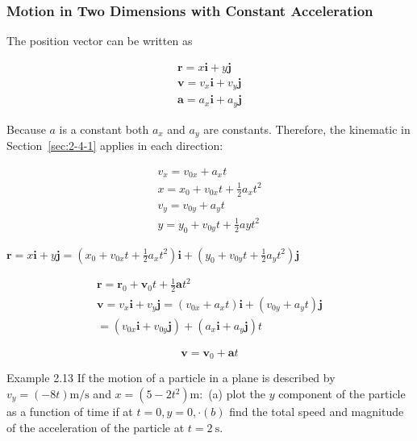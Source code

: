 \documentclass[10pt]{article}
\numberwithin{equation}{section}
\begin{document}
\subsubsection{Motion in Two Dimensions with Constant Acceleration}\label{sec:2-4-3}
The position vector can be written as

$$
\begin{gathered}
\mathbf{r}=x \mathbf{i}+y \mathbf{j} \\
\mathbf{v}=v_{x} \mathbf{i}+v_{y} \mathbf{j} \\
\mathbf{a}=a_{x} \mathbf{i}+a_{y} \mathbf{j}
\end{gathered}
$$

Because $a$ is a constant both $a_{x}$ and $a_{y}$ are constants. Therefore, the kinematic in Section~\ref{sec:2-4-1} applies in each direction:


\begin{gather}
v_{x}=v_{0 x}+a_{x} t  \label{eq:2-8}\\
x=x_{0}+v_{0 x} t+\frac{1}{2} a_{x} t^{2}  \label{eq:2-9}\\
v_{y}=v_{0 y}+a_{y} t  \label{eq:2-10}\\
y=y_{0}+v_{0 y} t+\frac{1}{2} a y t^{2} \label{eq:2-11}
\end{gather}


$\mathbf{r}=x \mathbf{i}+y \mathbf{j}=\left(x_{0}+v_{0 x} t+\frac{1}{2} a_{x} t^{2}\right) \mathbf{i}+\left(y_{0}+v_{0 y} t+\frac{1}{2} a_{y} t^{2}\right) \mathbf{j}$


\begin{gather}
\mathbf{r}=\mathbf{r}_{0}+\mathbf{v}_{0} t+\frac{1}{2} \mathbf{a} t^{2}  \label{eq:2-12}\\
\mathbf{v}=v_{x} \mathbf{i}+v_{y} \mathbf{j}=\left(v_{0 x}+a_{x} t\right) \mathbf{i}+\left(v_{0 y}+a_{y} t\right) \mathbf{j} \\
=\left(v_{0 x} \mathbf{i}+v_{0 y} \mathbf{j}\right)+\left(a_{x} \mathbf{i}+a_{y} \mathbf{j}\right) t
\end{gather}



\begin{equation}
\mathbf{v}=\mathbf{v}_{0}+\mathbf{a} t \label{eq:2-13}
\end{equation}


Example 2.13 If the motion of a particle in a plane is described by $v_{y}=(-8 t) \mathrm{m} / \mathrm{s}$ and $x=\left(5-2 t^{2}\right) \mathrm{m}:$ (a) plot the $y$ component of the particle as a function of time if at $t=0, y=0, \cdot(b)$ find the total speed and magnitude of the acceleration of the particle at $t=2 \mathrm{~s}$.
\end{document}
